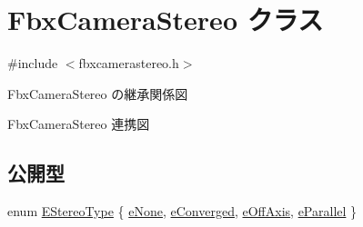 \hypertarget{class_fbx_camera_stereo}{}\section{Fbx\+Camera\+Stereo クラス}
\label{class_fbx_camera_stereo}


{\ttfamily \#include $<$fbxcamerastereo.\+h$>$}



Fbx\+Camera\+Stereo の継承関係図


Fbx\+Camera\+Stereo 連携図
\subsection*{公開型}
\begin{DoxyCompactItemize}
\item 
enum \hyperlink{class_fbx_camera_stereo_acb0f27675a73de0858983b703196cb37}{E\+Stereo\+Type} \{ \hyperlink{class_fbx_camera_stereo_acb0f27675a73de0858983b703196cb37acaf3e8d389472ecc3408aa946d13c31f}{e\+None}, 
\hyperlink{class_fbx_camera_stereo_acb0f27675a73de0858983b703196cb37a37c80e0a3ef659934cac67457a3f8c0c}{e\+Converged}, 
\hyperlink{class_fbx_camera_stereo_acb0f27675a73de0858983b703196cb37a15c8f9c81ecc4a7e7174fe214cfc5ec2}{e\+Off\+Axis}, 
\hyperlink{class_fbx_camera_stereo_acb0f27675a73de0858983b703196cb37a5a361b7a07b8066eaa3ecffa5d695370}{e\+Parallel}
 \}
\end{DoxyCompactItemize}
